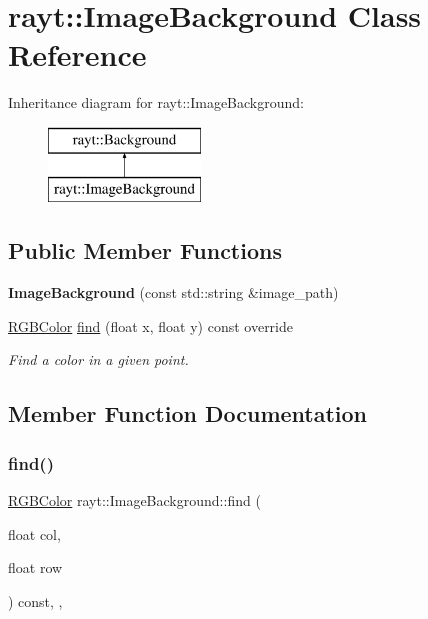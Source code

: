 \hypertarget{classrayt_1_1_image_background}{}\section{rayt\+::Image\+Background Class Reference}
\label{classrayt_1_1_image_background}
Inheritance diagram for rayt\+::Image\+Background\+:\begin{figure}[H]
\begin{center}
\leavevmode
\includegraphics[height=2.000000cm]{classrayt_1_1_image_background}
\end{center}
\end{figure}
\subsection*{Public Member Functions}
\begin{DoxyCompactItemize}
\item 
\mbox{\label{classrayt_1_1_image_background_ad0335823ba731c4e026b914082124e2e}} 
{\bfseries Image\+Background} (const std\+::string \&image\+\_\+path)
\item 
\mbox{\hyperlink{classtao_1_1_col}{R\+G\+B\+Color}} \mbox{\hyperlink{classrayt_1_1_image_background_a2b228ea0aa85f159b9d5b30f68ad809a}{find}} (float x, float y) const override
\begin{DoxyCompactList}\small\item\em Find a color in a given point. \end{DoxyCompactList}\end{DoxyCompactItemize}


\subsection{Member Function Documentation}
\mbox{\label{classrayt_1_1_image_background_a2b228ea0aa85f159b9d5b30f68ad809a}} 
\subsubsection{\texorpdfstring{find()}{find()}}
{\footnotesize\ttfamily \mbox{\hyperlink{classtao_1_1_col}{R\+G\+B\+Color}} rayt\+::\+Image\+Background\+::find (\begin{DoxyParamCaption}\item[{float}]{col,  }\item[{float}]{row }\end{DoxyParamCaption}) const\hspace{0.3cm}{\ttfamily [inline]}, {\ttfamily [override]}, {\ttfamily [virtual]}}



